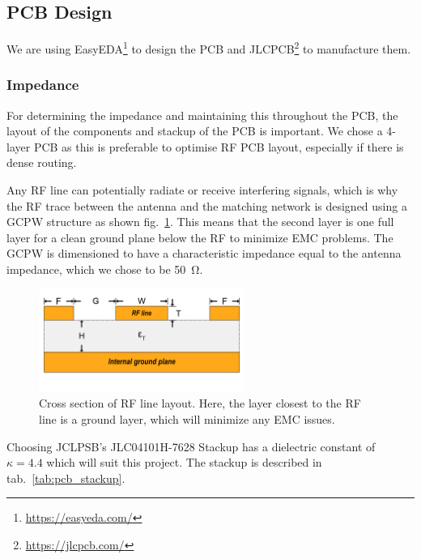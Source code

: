 \subsection{PCB Design}
We are using EasyEDA\footnote{\url{https://easyeda.com/}} to design the \ac{PCB} and JLCPCB\footnote{\url{https://jlcpcb.com/}} to manufacture them.

\subsubsection{Impedance}
For determining the impedance and maintaining this throughout the \ac{PCB}, the layout of the components and stackup of the \ac{PCB} is important. We chose a 4-layer \ac{PCB} as this is preferable to optimise \ac{RF} \ac{PCB} layout, especially if there is dense routing. 

Any \ac{RF} line can potentially radiate or receive interfering signals, which is why the \ac{RF} trace between the antenna and the matching network is designed using a \ac{GCPW} structure as shown fig.~\ref{fig:gcpw}. This means that the second layer is one full layer for a clean ground plane below the \ac{RF} to minimize \ac{EMC} problems. The \ac{GCPW} is dimensioned to have a characteristic impedance equal to the antenna impedance, which we chose to be \SI{50}{\ohm}.

\begin{figure}[H]
    \centering
    \includegraphics[width=0.6\textwidth]{figures/GCPW.png}
    \caption{Cross section of RF line layout. Here, the layer closest to the RF line is a ground layer, which will minimize any EMC issues.}
    \label{fig:gcpw}
\end{figure}

Choosing JCLPSB's JLC04101H-7628 Stackup has a dielectric constant of $\kappa = 4.4$ which will suit this project. The stackup is described in tab.~\ref{tab:pcb_stackup}.

